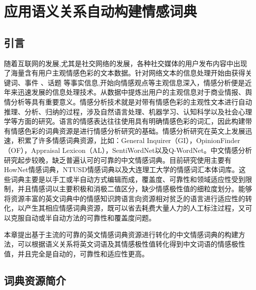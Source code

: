 \chapter{应用语义关系自动构建情感词典}
\label{ch2}

\section{引言}
\label{ch2:intro}
随着互联网的发展,尤其是社交网络的发展，各种社交媒体的用户发布内容中出现了海量含有用户主观情感色彩的文本数据。针对网络文本的信息处理开始由获得关键词、事件
、话题 等事实信息,开始向情感观点等主观信息深入，情感分析便是近年来迅速发展的信息处理技术。从数据中提炼出用户的主观信息对于商业情报、舆情分析等具有重要意义。情感分析技术就是对带有情感色彩的主观性文本进行自动推理、分析、归纳的过程，涉及自然语言处理、机器学习、认知科学以及社会心理学等方面的研究。语言的情感表达往往使用具有明确情感色彩的词汇，因此构建带有情感色彩的词典资源是进行情感分析研究的基础。情感分析研究在英文上发展迅速，积累了许多情感词典资源，比如：General Inquirer（GI），OpinionFinder（OF），Appraisal Lexicon（AL），SentiWordNet以及Q-WordNet。中文情感分析研究起步较晚，缺乏普遍认可的可靠的中文情感词典。目前研究使用主要有HowNet情感词典，NTUSD情感词典以及大连理工大学的情感词汇本体词库。这些词典主要是以手工或半自动方式编辑而成，覆盖度、可靠性和领域适应性受到限制，并且情感词以主要积极和消极二值区分，缺少情感极性值的细粒度划分。能够将资源丰富的英文词典中的情感知识跨语言向资源相对贫乏的语言进行适应性的转化，以产生其相应情感词典资源，既可以省去耗费大量人力的人工标注过程，又可以克服自动或半自动方法的可靠性和覆盖度问题。

本章提出基于主流的可靠的英文情感词典资源进行转化的中文情感词典的构建方法，可以根据语义关系将英文词语及其情感极性值转化得到中文词语的情感极性值，并且完全是自动的，可靠性和适应性更高。

\section{词典资源简介}
\label{ch2:lex}

